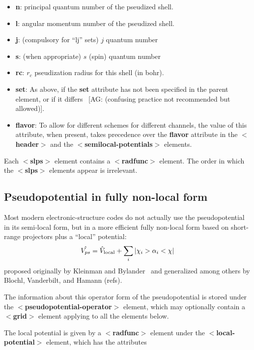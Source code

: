 \documentclass[prb,showpacs,superscriptaddress]{revtex4-1}
\def\tag#1{\textbf{$<$#1$>$}}
\def\att#1{\textbf{#1}}
\newcommand{\AG}[1]{{\color{red}~\textsf{[AG: #1]}}}
\begin{document}
 \begin{itemize}
    \item \att{n}: principal quantum number of the
      pseudized shell.
    \item \att{l}: angular momentum number of the pseudized shell.
    \item \att{j}: (compulsory for ``lj'' sets) $j$ quantum number
    \item \att{s}: (when appropriate) $s$ (spin) quantum number
    \item \att{rc}: $r_c$ pseudization radius for this shell
          (in bohr).
    \item \att{set}: As above, if the \att{set} attribute has not been
     specified in the parent element, or if it differs \AG{(confusing
     practice not recommended but allowed)}.
    \item \att{flavor}: To allow for different schemes for
      different channels, the value of this attribute, when present,
      takes precedence over the \att{flavor} attribute in the
      \tag{header} and the \tag{semilocal-potentials} elements.
 \end{itemize}

Each \tag{slps} element contains a \tag{radfunc}
element. The order in which the \tag{slps} elements appear
is irrelevant.

\subsection{Pseudopotential in fully non-local form}

Most modern electronic-structure codes do not actually use the
pseudopotential in its semi-local form, but in a more efficient fully non-local
form based on short-range projectors plus a ``local'' potential:
\begin{equation}
\hat{V_{ps}}  = \hat{V}_{\rm local} + \sum_i {|\chi_i> \alpha_i <\chi|}
\end{equation}
%
proposed originally by Kleinman and Bylander~\cite{KB} and generalized
among others by Blochl, Vanderbilt, and Hamann (refs). 

The information about this operator form of the pseudopotential is
stored under the \tag{pseudopotential-operator} element, which may
optionally contain a \tag{grid} element applying to all the elements
below.

The local potential is given by a \tag{radfunc} element under the
\tag{local-potential} element, which has the attributes
\end{document}
